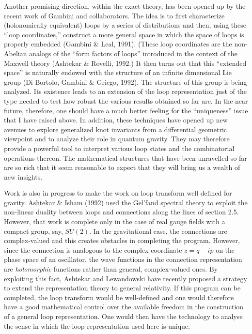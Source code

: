 Another promising direction, within the exact theory, has been opened up by the
recent work of Gambini and collaborators.  The idea is to first characterize
(holonomically equivalent) loops by a series of distributions and then, using
these ``loop coordinates,'' construct a more general space in which the space
of loops is properly embedded (Gambini \& Leal, 1991).  (These loop coordinates
are the non-Abelian analogs of the ``form factors of loops'' introduced in the
context of the Maxwell theory (Ashtekar \& Rovelli, 1992.)  It then turns out
that this ``extended space'' is naturally endowed with the structure of an
infinite dimensional Lie group (Di Bortolo, Gambini \& Griego, 1992). The
structure of this group is being analyzed.  Its existence leads to an
extension of the loop representation just of the type needed to test how
robust the various results obtained so far are. In the near future, therefore,
one should have a much better feeling for the ``uniqueness'' issue that I
have raised above. In addition, these techniques have opened up new avenues to
explore generalized knot invariants from a differential geometric viewpoint
and to analyze their role in quantum gravity. They may therefore provide a
powerful tool to interpret various loop states and the combinatorial
operations thereon. The mathematical structures that have been unravelled so
far are so rich that it seem reasonable to expect that they will bring us a
wealth of new insights.

Work is also in progress to make the work on loop transform well defined for
gravity.  Ashtekar \& Isham (1992) used the Gel'fand spectral theory to exploit
the non-linear duality between loops and connections along the lines of section
2.5. However, that work is complete only in the case of real gauge fields with
a compact group, say, $SU(2)$. In the gravitational case, the connections are
complex-valued and this creates obstacles in completing the program. However,
since the connection is analogous to the complex coordinate $z=q-ip$ on the
phase space of an oscillator, the wave functions in the connection
representation are {\it holomorphic} functions rather than general,
complex-valued ones. By exploiting this fact, Ashtekar and Lewandowski have
recently proposed a strategy to extend the representation theory to general
relativity.  If this program can be completed, the loop transform would be
well-defined and one would therefore have a good mathematical control over the
available freedom in the construction of a general loop representation. One
would then have the technology to analyse the sense in which the loop
representation used here is unique.

